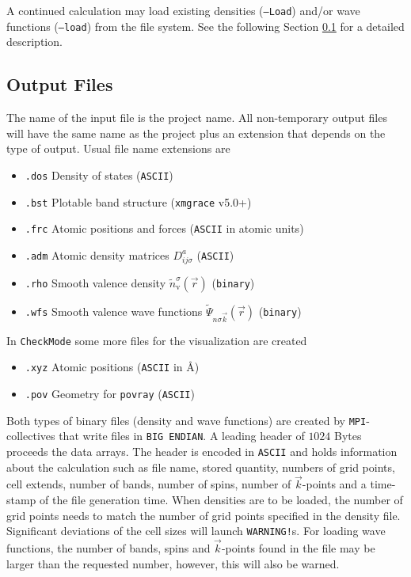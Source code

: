 \documentclass[12pt,BCOR8mm,noappendixprefix,nochapterprefix,bibtotoc,idxtotoc,openbib,tablecaptionabove]{scrbook}
\newcommand{\um}[1]{_{\mathrm{#1}} }
\newcommand{\ADM}{ D^a }
\newcommand{\PSI}{ \tilde\Psi }
\newcommand{\RHOV}{ \tilde{n}\um{v} }
\newcommand{\ttt}[1]{\texttt{#1}}
\begin{document}
A continued calculation may load existing densities (\ttt{--Load}) and/or wave functions (\ttt{--load}) 
from the file system. See the following Section \ref{sec:MAN_output_files} for a detailed description.


\subsection{Output Files} \label{sec:MAN_output_files}

The name of the input file is the project name. 
All non-temporary output files will have the same name as the 
project plus an extension that depends on the type of output. 
Usual file name extensions are
\begin{itemize}
 \item \ttt{.dos} Density of states (\ttt{ASCII}) %
 \item \ttt{.bst} Plotable band structure (\ttt{xmgrace} v5.0+)
 \item \ttt{.frc} Atomic positions and forces (\ttt{ASCII} in atomic units)
 \item \ttt{.adm} Atomic density matrices $\ADM_{ij\sigma}$ (\ttt{ASCII})
 \item \ttt{.rho} Smooth valence density $\RHOV^\sigma(\vec r)$ (\ttt{binary})
 \item \ttt{.wfs} Smooth valence wave functions $\PSI_{n\sigma \vec k}(\vec r)$ (\ttt{binary})
\end{itemize}
In \ttt{CheckMode} some more files for the visualization are created
\begin{itemize}
 \item \ttt{.xyz} Atomic positions (\ttt{ASCII} in \AA)
 \item \ttt{.pov} Geometry for \ttt{povray} (\ttt{ASCII})
\end{itemize}

Both types of binary files (density and wave functions) are created by \ttt{MPI}-collectives 
that write files in \ttt{BIG ENDIAN}. A leading header of $1024$ Bytes proceeds the data arrays. 
The header is encoded in \ttt{ASCII} and holds information about the calculation such as file name, 
stored quantity, numbers of grid points, cell extends, number of bands, number of spins, 
number of $\vec k$-points and a time-stamp of the file generation time. 
When densities are to be loaded, the number of grid points needs to match 
the number of grid points specified in the density file. Significant deviations of the 
cell sizes will launch \ttt{WARNING!}s. For loading wave functions, the number of bands, 
spins and $\vec k$-points found in the file may be larger than the requested number, however, this will also be warned.
\end{document}
